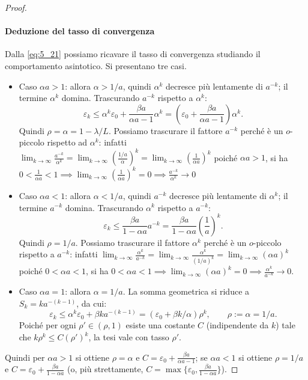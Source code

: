 \documentclass[a4paper,12pt]{article}
\numberwithin{equation}{section}
\numberwithin{figure}{section}
\numberwithin{table}{section}
\begin{document}
\begin{proof}
\paragraph{Deduzione del tasso di convergenza}

Dalla \eqref{eq:5_21} possiamo ricavare il tasso di convergenza studiando il comportamento asintotico. Si presentano tre casi.

\begin{itemize}

\item Caso $\alpha a > 1$: allora $\alpha > 1/a$, quindi $\alpha^k$ decresce più lentamente di $a^{-k}$; il termine $\alpha^k$ domina. Trascurando $a^{-k}$ rispetto a $\alpha^k$:
\[
\varepsilon_k \le \alpha^k \varepsilon_0 + \frac{\beta a}{\alpha a - 1} \alpha^k
= \left(\varepsilon_0 + \frac{\beta a}{\alpha a - 1}\right) \alpha^k.
\]
Quindi $\rho = \alpha = 1 - \lambda/L$.
Possiamo trascurare il fattore $a^{-k}$ perché è un $o$-piccolo rispetto ad $\alpha^k$: infatti $\lim_{k \to \infty} \frac{a^{-k}}{\alpha^k} = \lim_{k \to \infty} \left(\frac{1/a}{\alpha}\right)^k = \lim_{k \to \infty} \left(\frac{1}{\alpha a}\right)^k$ poiché $\alpha a > 1$, si ha $0 < \frac{1}{\alpha a} < 1 \implies \lim_{k \to \infty} \left(\frac{1}{\alpha a}\right)^k = 0 \implies \frac{a^{-k}}{\alpha^k} \to 0$

\item Caso $\alpha a < 1$: allora $\alpha < 1/a$, quindi $a^{-k}$ decresce più lentamente di $\alpha^k$; il termine $a^{-k}$ domina. Trascurando $\alpha^k$ rispetto a $a^{-k}$:
\[
\varepsilon_k \le \frac{\beta a}{1 - \alpha a} a^{-k}
= \frac{\beta a}{1 - \alpha a} \left(\frac{1}{a}\right)^k.
\]
Quindi $\rho = 1/a$.
Possiamo trascurare il fattore $\alpha^k$ perché è un $o$-piccolo rispetto a $a^{-k}$: infatti $\lim_{k \to \infty} \frac{\alpha^k}{a^{-k}}
= \lim_{k \to \infty} \frac{\alpha^k}{(1/a)^k}
= \lim_{k \to \infty} (\alpha a)^k$
poiché $0<\alpha a < 1$, si ha $0 < \alpha a < 1 \implies \lim_{k \to \infty} (\alpha a)^k = 0 \implies \frac{\alpha^k}{a^{-k}} \to 0$.
\item Caso $\alpha a = 1$: allora $\alpha = 1/a$. La somma geometrica si riduce a $S_k = k a^{-(k-1)}$, da cui:
\[
\varepsilon_k \le \alpha^k \varepsilon_0 + \beta k a^{-(k-1)} = (\varepsilon_0 + \beta k/\alpha)\rho^k,
\qquad\rho:=\alpha=1/a.
\]
Poich\'e per ogni $\rho' \in (\rho,1)$ esiste una costante $C$ (indipendente da $k$) tale che $k\rho^k \le C(\rho')^k$, la tesi vale con tasso $\rho'$.
\end{itemize}
 Quindi per $\alpha a>1$ si ottiene $\rho=\alpha$ e $C=\varepsilon_0+\frac{\beta a}{\alpha a-1}$; se $\alpha a<1$ si ottiene $\rho=1/a$ e $C=\varepsilon_0+\frac{\beta a}{1-\alpha a}$ (o, più strettamente, $C=\max\{\varepsilon_0,\frac{\beta a}{1-\alpha a}\}$).


\end{proof}
\end{document}

